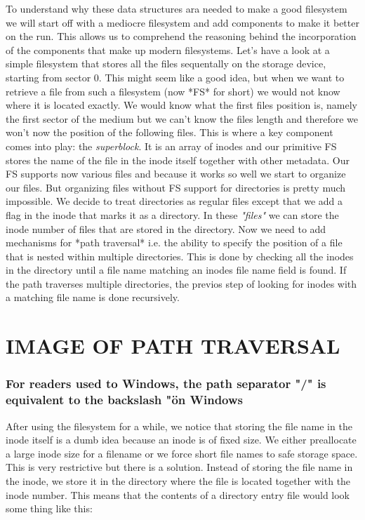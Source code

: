 To understand why these data structures ara needed to make a good filesystem we will start off with a
mediocre filesystem and add components to make it better on the run. This allows us to comprehend the 
reasoning behind the incorporation of the components that make up modern filesystems.
Let's have a look at a simple filesystem that stores all the files sequentally on the storage device,
starting from sector 0. This might seem like a good idea, but when we want to retrieve a file from
such a filesystem (now *FS* for short) we would not know where it is located exactly. We would know
what the first files position is, namely the first sector of the medium but we can't know the files
length and therefore we won't now the  position of the following files. This is where a key component
comes into play: the \textit{superblock}. It is an array of inodes and our primitive FS stores the name of
the file in the inode itself together with other metadata. Our FS supports now various files and
because it works so well we start to organize our files. But organizing files without FS support for
directories is pretty much impossible. We decide to treat directories as regular files except that we
add a flag in the inode that marks it as a directory. In these \textit{"files"} we can store the inode number
of files that are stored in the directory. Now we need to add mechanisms for *path traversal* i.e. the
ability to specify the position of a file that is nested within multiple directories. This is done by
checking all the inodes in the directory until a file name matching an inodes file name field is
found. If the path traverses multiple directories, the previos step of looking for inodes with a
matching file name is done recursively.

\section{IMAGE OF PATH TRAVERSAL}

\subsubsection{For readers used to Windows, the path separator "/" is equivalent to the backslash "\" on Windows}


After using the filesystem for a while, we notice that storing the file name in the inode itself is a
dumb idea because an inode is of fixed size. We either preallocate a large inode size for a filename
or we force short file names to safe storage space. This is very restrictive but there is a solution.
Instead of storing the file name in the inode, we store it in the directory where the file is located
together with the inode number. This means that the contents of a directory entry file would look some
thing like this:

